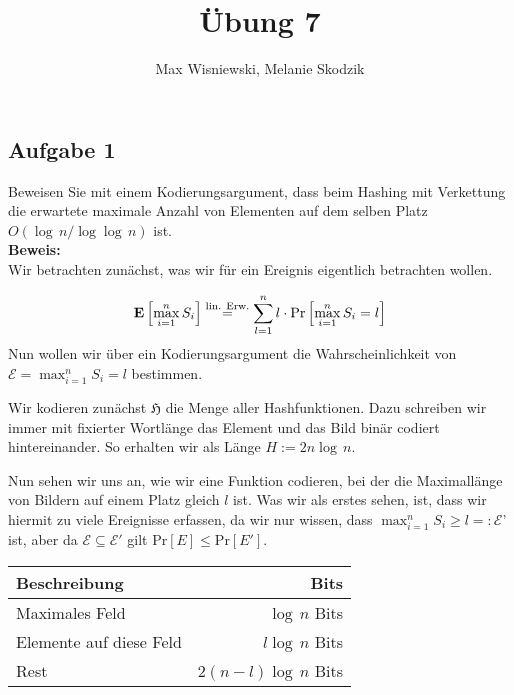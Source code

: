 \documentclass[11pt,a4paper,ngerman]{article}
\date{}
\title{Übung 7}
\author{Max Wisniewski, Melanie Skodzik}
\newcommand{\erw}[1]{\text{\bfseries E} \left[ #1 \right]}
\newcommand{\prob}[1]{\text{Pr}\left[ #1 \right]}
\begin{document}

\renewcommand{\figurename}{Grafik}

\maketitle
\thispagestyle{fancy}


\subsection*{Aufgabe 1}

Beweisen Sie mit einem Kodierungsargument, dass beim Hashing mit Verkettung die erwartete maximale Anzahl von Elementen auf dem selben Platz $O(\log \,n / \log \log \, n)$ ist.\\

\noindent\textbf{Beweis:}\\

Wir betrachten zunächst, was wir für ein Ereignis eigentlich betrachten wollen.

$$
   \erw{\max_{i=1}^n S_i} \stackrel{\text{lin. Erw.}}{=} 
      \sum_{l=1}^n l \cdot \prob{\max_{i=1}^n S_i = l}
$$
Nun wollen wir über ein Kodierungsargument die Wahrscheinlichkeit von $\mathcal{E}=\max_{i=1}^n S_i = l$ bestimmen. 

Wir kodieren zunächst $\mathfrak{H}$ die Menge aller Hashfunktionen. Dazu schreiben wir
immer mit fixierter Wortlänge das Element und das Bild binär codiert hintereinander.
So erhalten wir als Länge $H := 2 n \log \, n$.

Nun sehen wir uns an, wie wir eine Funktion codieren, bei der die Maximallänge 
von Bildern auf einem Platz gleich $l$ ist. Was wir als erstes sehen, ist,
dass wir hiermit zu viele Ereignisse erfassen, da wir nur wissen, dass $\max_{i=1}^n S_i \geq l =: \mathcal{E}$' ist, aber da $\mathcal{E} \subseteq \mathcal{E}'$ gilt
$\prob{E} \leq \prob{E'}$.

\begin{center}
   \begin{tabularx}{0.7\textwidth}{l|r}
      Beschreibung & Bits\\
      \hline
      Maximales Feld & $\log \, n$ Bits\\
      Elemente auf diese Feld & $l \log \, n$ Bits\\
      Rest           & $2(n - l) \log \, n$ Bits
   \end{tabularx}
\end{center}
\end{document}
